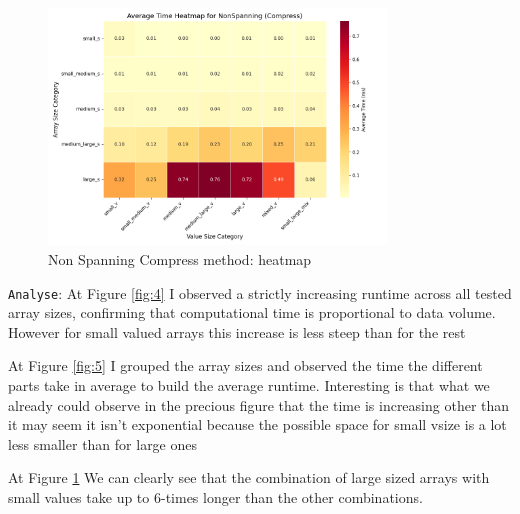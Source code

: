 \documentclass[11pt, a4paper]{article}
\begin{document}
	\begin{figure}[H]%
		\centering
		\includegraphics[width=0.8\textwidth]{Grafics/NonSpanning/NonSpanningCompressHeat.png}
		\caption{Non Spanning Compress method: heatmap}
		\label{fig:6}
	\end{figure}
	\texttt{Analyse}: At Figure \ref{fig:4} I observed a strictly increasing runtime across all tested array sizes, confirming that computational time is proportional to data volume. However for small valued arrays this increase is less steep than for the rest  
		\par %
	
	At Figure \ref{fig:5} I grouped the array sizes and observed the time the different parts take in average to build the average runtime. Interesting is that what we already could observe in the precious figure that the time is increasing other than it may seem it isn't exponential because the possible space for small vsize is a lot less smaller than for large ones
	
	At Figure \ref{fig:6} We can clearly see that the combination of large sized arrays with small values take up to 6-times longer than the other combinations.
	
\end{document}
